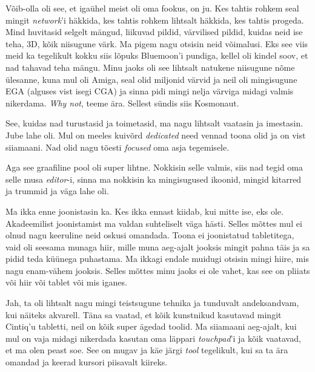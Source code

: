 Võib-olla oli see, et igaühel meist oli oma fookus, on ju. Kes tahtis rohkem 
seal mingit \emph{network}'i häkkida, kes tahtis rohkem lihtsalt häkkida, kes 
tahtis progeda. Mind huvitasid selgelt mängud, liikuvad pildid, värvilised 
pildid, kuidas neid ise teha, 3D, kõik niisugune värk. Ma pigem nagu otsisin 
neid võimalusi. Eks see viis meid ka tegelikult kokku siis lõpuks 
Bluemoon'i pundiga, kellel oli  kindel soov, et nad tahavad 
teha mängu. Minu jaoks oli see lihtsalt natukene niisugune nõme ülesanne, kuna 
mul oli Amiga, seal olid miljonid värvid ja neil oli 
mingisugune EGA (alguses vist isegi CGA) ja sinna pidi mingi nelja värviga 
midagi valmis nikerdama. \emph{Why not}, teeme ära. Sellest sündis siis 
Kosmonaut. 

See, kuidas nad turustasid ja toimetasid, ma nagu lihtsalt vaatasin ja 
imestasin. Jube lahe oli. Mul on meeles kuivõrd \emph{dedicated} need vennad 
toona olid ja on vist siiamaani. Nad olid nagu tõesti  \emph{focused} oma asja 
tegemisele. 

Aga see graafiline pool oli super lihtne. Nokkisin selle valmis, siis nad tegid 
oma selle musa \emph{editor}-i, sinna ma nokkisin ka mingisugused ikoonid, 
mingid kitarred ja  trummid ja väga lahe oli.


Ma ikka enne joonistasin ka. Kes ikka ennast kiidab, kui mitte ise, eks ole. 
Akadeemilist joonistamist ma valdan  suhteliselt väga hästi. Selles mõttes mul 
ei olnud nagu keeruline neid oskusi omandada. Toona ei joonistatud tabletitega, 
vaid oli seesama munaga hiir, mille muna aeg-ajalt jooksis mingit pahna täis ja 
sa pidid teda küünega puhastama. Ma ikkagi endale muidugi otsisin mingi hiire, 
mis nagu enam-vähem jooksis. Selles mõttes minu jaoks ei ole vahet, kas see on 
pliiats või hiir või tablet või mis iganes. 


Jah, ta oli lihtsalt nagu mingi teistsugune tehnika ja tunduvalt andeksandvam, 
kui näiteks akvarell. Täna sa vaatad, et  kõik kunstnikud kasutavad mingit 
Cintiq'u tabletti, neil on kõik super ägedad toolid. Ma siiamaani aeg-ajalt, 
kui mul on vaja midagi nikerdada kasutan oma läppari \emph{touchpad}'i ja kõik 
vaatavad, et ma olen peast soe. See on mugav ja käe järgi \emph{tool} 
tegelikult, kui sa ta ära omandad ja keerad kursori piisavalt kiireks.

